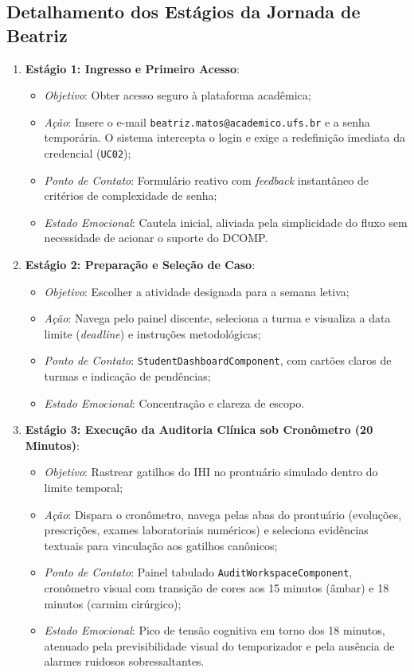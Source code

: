 \subsection{Detalhamento dos Estágios da Jornada de Beatriz}
\begin{enumerate}
    \item \textbf{Estágio 1: Ingresso e Primeiro Acesso}:
    \begin{itemize}
        \item \textit{Objetivo}: Obter acesso seguro à plataforma acadêmica;
        \item \textit{Ação}: Insere o e-mail \texttt{beatriz.matos@academico.ufs.br} e a senha temporária. O sistema intercepta o login e exige a redefinição imediata da credencial (\texttt{UC02});
        \item \textit{Ponto de Contato}: Formulário reativo com \textit{feedback} instantâneo de critérios de complexidade de senha;
        \item \textit{Estado Emocional}: Cautela inicial, aliviada pela simplicidade do fluxo sem necessidade de acionar o suporte do DCOMP.
    \end{itemize}

    \item \textbf{Estágio 2: Preparação e Seleção de Caso}:
    \begin{itemize}
        \item \textit{Objetivo}: Escolher a atividade designada para a semana letiva;
        \item \textit{Ação}: Navega pelo painel discente, seleciona a turma e visualiza a data limite (\textit{deadline}) e instruções metodológicas;
        \item \textit{Ponto de Contato}: \texttt{StudentDashboardComponent}, com cartões claros de turmas e indicação de pendências;
        \item \textit{Estado Emocional}: Concentração e clareza de escopo.
    \end{itemize}

    \item \textbf{Estágio 3: Execução da Auditoria Clínica sob Cronômetro (20 Minutos)}:
    \begin{itemize}
        \item \textit{Objetivo}: Rastrear gatilhos do IHI no prontuário simulado dentro do limite temporal;
        \item \textit{Ação}: Dispara o cronômetro, navega pelas abas do prontuário (evoluções, prescrições, exames laboratoriais numéricos) e seleciona evidências textuais para vinculação aos gatilhos canônicos;
        \item \textit{Ponto de Contato}: Painel tabulado \texttt{AuditWorkspaceComponent}, cronômetro visual com transição de cores aos 15 minutos (âmbar) e 18 minutos (carmim cirúrgico);
        \item \textit{Estado Emocional}: Pico de tensão cognitiva em torno dos 18 minutos, atenuado pela previsibilidade visual do temporizador e pela ausência de alarmes ruidosos sobressaltantes.
    \end{itemize}


\end{enumerate}
